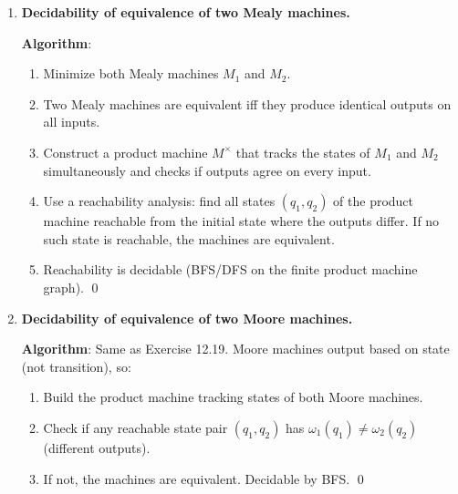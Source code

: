 \begin{enumerate}[{12.}1. ]
\textbf{Claim}: $L(A)$ is infinite iff $\{\DBAR(s_0,y)\mid 5n\leq|y|<6n\}\cap F\neq\emptyset$.

($\Rightarrow$): If $L(A)$ is infinite, it contains strings of arbitrary length, so in particular strings of length between $5n$ and $6n-1$. Hence the intersection is nonempty.

($\Leftarrow$): If the intersection is nonempty, there exists a string of length $5n\leq k<6n$ in $L(A)$. Since $k\geq 5n>n=|S|$, by the pigeonhole principle some state repeats in the path of length $k$; thus a shorter string is also accepted, and by applying the pumping argument, $L(A)$ is infinite.

So yes, this alternative range would work correctly. \qed

\item \textbf{Decidability of equivalence of two Mealy machines.}

\textbf{Algorithm}:
\begin{enumerate}
\item Minimize both Mealy machines $M_1$ and $M_2$.
\item Two Mealy machines are equivalent iff they produce identical outputs on all inputs.
\item Construct a product machine $M^\times$ that tracks the states of $M_1$ and $M_2$ simultaneously and checks if outputs agree on every input.
\item Use a reachability analysis: find all states $(q_1,q_2)$ of the product machine reachable from the initial state where the outputs differ. If no such state is reachable, the machines are equivalent.
\item Reachability is decidable (BFS/DFS on the finite product machine graph). \qed
\end{enumerate}

\item \textbf{Decidability of equivalence of two Moore machines.}

\textbf{Algorithm}: Same as Exercise 12.19. Moore machines output based on state (not transition), so:
\begin{enumerate}
\item Build the product machine tracking states of both Moore machines.
\item Check if any reachable state pair $(q_1, q_2)$ has $\omega_1(q_1)\neq\omega_2(q_2)$ (different outputs).
\item If not, the machines are equivalent. Decidable by BFS. \qed
\end{enumerate}


\end{enumerate}
